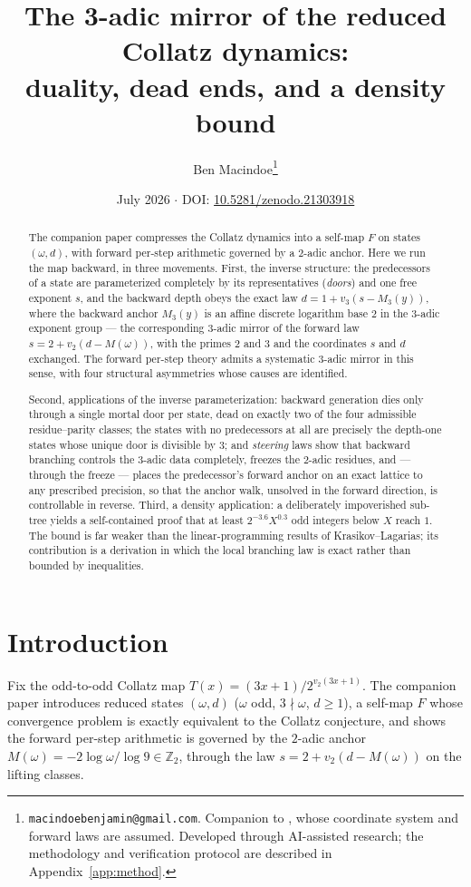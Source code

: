 \documentclass[11pt]{article}
\title{The 3-adic mirror of the reduced Collatz dynamics:\\ duality, dead ends, and a density bound}
\author{Ben Macindoe\thanks{\texttt{macindoebenjamin@gmail.com}. Companion to \cite{paper1}, whose coordinate system and forward laws are assumed. Developed through AI-assisted research; the methodology and verification protocol are described in Appendix~\ref{app:method}.}}
\date{July 2026 $\cdot$ DOI: \href{https://doi.org/10.5281/zenodo.21303918}{10.5281/zenodo.21303918}}
\theoremstyle{remark}
\newcommand{\Z}{\mathbb{Z}}
\newcommand{\vt}[1]{v_2\!\left(#1\right)}
\newcommand{\vth}[1]{v_3\!\left(#1\right)}
\newcommand{\w}{\omega}
\begin{document}
\maketitle

\begin{abstract}
The companion paper \cite{paper1} compresses the Collatz dynamics into a self-map $F$ on states $(\w,d)$, with forward per-step arithmetic governed by a $2$-adic anchor. Here we run the map backward, in three movements. First, the inverse structure: the predecessors of a state are parameterized completely by its representatives (\emph{doors}) and one free exponent $s$, and the backward depth obeys the exact law $d = 1 + \vth{s - M_3(y)}$, where the backward anchor $M_3(y)$ is an affine discrete logarithm base $2$ in the $3$-adic exponent group --- the corresponding $3$-adic mirror of the forward law $s = 2 + \vt{d - M(\w)}$, with the primes $2$ and $3$ and the coordinates $s$ and $d$ exchanged. The forward per-step theory admits a systematic $3$-adic mirror in this sense, with four structural asymmetries whose causes are identified.

Second, applications of the inverse parameterization: backward generation dies only through a single mortal door per state, dead on exactly two of the four admissible residue--parity classes; the states with no predecessors at all are precisely the depth-one states whose unique door is divisible by $3$; and \emph{steering} laws show that backward branching controls the $3$-adic data completely, freezes the $2$-adic residues, and --- through the freeze --- places the predecessor's forward anchor on an exact lattice to any prescribed precision, so that the anchor walk, unsolved in the forward direction, is controllable in reverse. Third, a density application: a deliberately impoverished sub-tree yields a self-contained proof that at least $2^{-3.6}X^{0.3}$ odd integers below $X$ reach $1$. The bound is far weaker than the linear-programming results of Krasikov--Lagarias; its contribution is a derivation in which the local branching law is exact rather than bounded by inequalities.
\end{abstract}

\section{Introduction}

Fix the odd-to-odd Collatz map $T(x) = (3x+1)/2^{\vt{3x+1}}$. The companion paper \cite{paper1} introduces reduced states $(\w, d)$ ($\w$ odd, $3\nmid\w$, $d \ge 1$), a self-map $F$ whose convergence problem is exactly equivalent to the Collatz conjecture, and shows the forward per-step arithmetic is governed by the $2$-adic anchor $M(\w) = -2\log\w/\log 9 \in \Z_2$, through the law $s = 2 + \vt{d - M(\w)}$ on the lifting classes.
\end{document}
